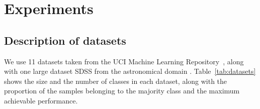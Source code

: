 \documentclass[fleqn,10pt,lineno]{wlpeerj} %
\begin{document}
\section{Experiments}\label{sec:expt}

\subsection{Description of datasets}

We use 11 datasets taken from the UCI Machine Learning
Repository~\citep{lichman13}, along with one large dataset SDSS from the
astronomical domain \citep{alam15}. Table~\ref{tab:datasets} shows the size and
the number of classes in each dataset, along with the proportion of the samples
belonging to the majority class and the maximum achievable performance.
\end{document}
